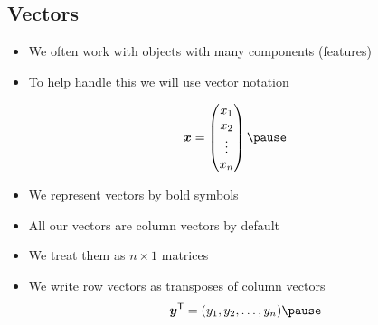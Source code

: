 \begin{slide}
\section[-2]{Vectors}

\begin{PauseHighLight}
  \begin{itemize}
  \item We often work with objects with many components (features)\pause
  \item To help handle this we will use vector notation\pause
  \end{itemize}
  \begin{minipage}{0.29\linewidth}
    \begin{align*}
      \bm{x} =
      \begin{pmatrix}
        x_1 \\ x_2 \\ \vdots \\ x_n
      \end{pmatrix}\pause
    \end{align*}
  \end{minipage}
  \begin{minipage}{0.69\linewidth}
    \begin{itemize}
    \item We represent vectors by bold symbols\pause
    \item All our vectors are column vectors by default\pause
    \item We treat them as $n\times 1$ matrices\pause
    \end{itemize}
  \end{minipage}
  \begin{itemize}
  \item We write row vectors as transposes of column vectors
    \begin{align*}
      \bm{y}^\tr = (y_1, y_2, \ldots, y_n)\pause
    \end{align*}
  \end{itemize}
\end{PauseHighLight}
\end{slide}



